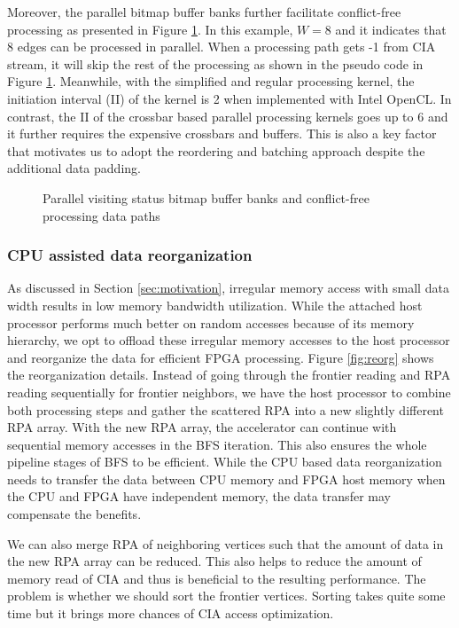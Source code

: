 Moreover, the parallel bitmap buffer banks further facilitate 
conflict-free processing as presented in Figure \ref{fig:bitmap}. 
In this example, $W = 8$ and it indicates that 8 edges can be 
processed in parallel. When a processing path gets -1 
from CIA stream, it will skip the rest of the processing as shown 
in the pseudo code in Figure \ref{fig:bitmap}.
Meanwhile, with the simplified and regular processing kernel, 
the initiation interval (II) of the kernel is 2 when implemented 
with Intel OpenCL. In contrast, the II of the crossbar based 
parallel processing kernels \cite{ham2016graphicionado} goes up to 6 
and it further requires the expensive crossbars and buffers. 
This is also a key factor that motivates us to adopt the reordering and 
batching approach despite the additional data padding.

\begin{figure}
    \caption{Parallel visiting status bitmap buffer banks and conflict-free processing data paths}
\label{fig:bitmap}
\end{figure}

\subsubsection{CPU assisted data reorganization}
As discussed in Section \ref{sec:motivation}, irregular memory access with 
small data width results in low memory bandwidth utilization. While the 
attached host processor performs much better on random accesses because 
of its memory hierarchy, we opt to offload these irregular memory accesses 
to the host processor and reorganize the data for efficient FPGA processing. 
Figure \ref{fig:reorg} shows the reorganization details. Instead 
of going through the frontier reading and RPA reading sequentially for 
frontier neighbors, we have the host processor to combine both processing steps 
and gather the scattered RPA into a new slightly different RPA array.
With the new RPA array, the accelerator can continue with sequential memory 
accesses in the BFS iteration. This also ensures the whole pipeline stages of BFS to be 
efficient. While the CPU based data reorganization needs to 
transfer the data between CPU memory and FPGA host memory 
when the CPU and FPGA have independent memory, the data transfer 
may compensate the benefits. 

We can also merge RPA of neighboring vertices such that 
the amount of data in the new RPA array can be reduced. This 
also helps to reduce the amount of memory read of CIA and thus 
is beneficial to the resulting performance.
The problem is whether we should sort the frontier vertices.
Sorting takes quite some time but it brings more chances of 
CIA access optimization.

